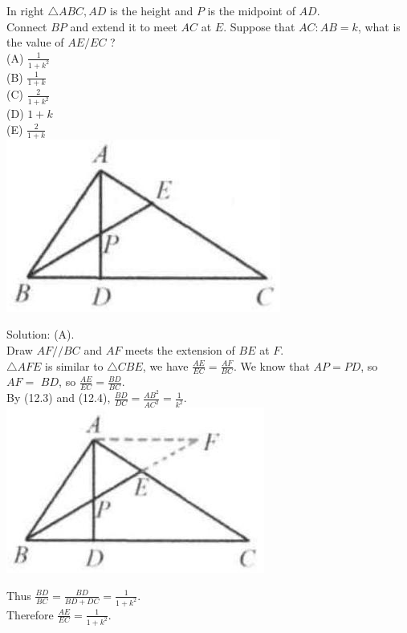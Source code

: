 \documentclass{article}
\begin{document}
In right \(\triangle A B C, A D\) is the height and \(P\) is the midpoint of \(A D\).\\
Connect \(B P\) and extend it to meet \(A C\) at \(E\). Suppose that \(A C: A B=k\), what is the value of \(A E / E C\) ?\\
(A) \(\frac{1}{1+k^{2}}\)\\
(B) \(\frac{1}{1+k}\)\\
(C) \(\frac{2}{1+k^{2}}\)\\
(D) \(1+k\)\\
(E) \(\frac{2}{1+k}\)\\
\centering
\includegraphics[width=\textwidth]{images/108(1).jpg}

Solution: (A).\\
Draw \(A F / / B C\) and \(A F\) meets the extension of \(B E\) at \(F\).\\
\(\triangle A F E\) is similar to \(\triangle C B E\), we have \(\frac{A E}{E C}=\frac{A F}{B C}\). We know that \(A P=P D\), so \(A F=\) \(B D\), so \(\frac{A E}{E C}=\frac{B D}{B C}\).\\
By (12.3) and (12.4), \(\frac{B D}{D C}=\frac{A B^{2}}{A C^{2}}=\frac{1}{k^{2}}\).\\
\centering
\includegraphics[width=\textwidth]{images/108.jpg}

Thus \(\frac{B D}{B C}=\frac{B D}{B D+D C}=\frac{1}{1+k^{2}}\).\\
Therefore \(\frac{A E}{E C}=\frac{1}{1+k^{2}}\).
\end{document}
